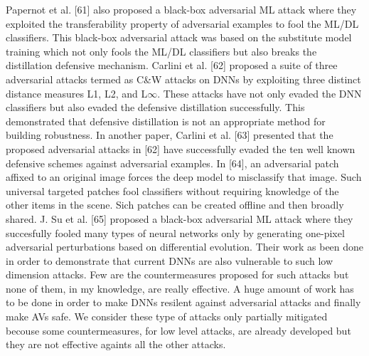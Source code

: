     \newline
    Papernot et al. [61] also proposed a black-box adversarial ML attack where they exploited the transferability property of adversarial examples to fool the ML/DL classifiers. This black-box adversarial attack was based on the substitute model training which not only fools the ML/DL classifiers but also breaks the distillation defensive mechanism. 
    \newline
    Carlini et al. [62] proposed a suite of three adversarial attacks termed as C\&W attacks on DNNs by exploiting three distinct distance measures L1, L2, and L$\infty$. These attacks have not only evaded the DNN classifiers but also evaded the defensive distillation successfully. This demonstrated that defensive distillation is not an appropriate method for building robustness. In another paper, Carlini et al. [63] presented that the proposed adversarial attacks in [62] have successfully evaded the ten well known defensive schemes against adversarial examples.
    \newline
    In [64], an adversarial patch affixed to an original image forces the deep model to misclassify that image. Such universal targeted patches fool classifiers without requiring knowledge of the other items in the scene. Sich patches can be created offline and then broadly shared. 
    \newline
    J. Su et al. [65] proposed a black-box adversarial ML attack where they succesfully fooled many types of neural networks only by generating one-pixel adversarial perturbations based on differential evolution. Their work as been done in order to demonstrate that current DNNs are also vulnerable to such low dimension attacks.
    \newline
    Few are the countermeasures proposed for such attacks but none of them, in my knowledge, are really effective. A huge amount of work has to be done in order to make DNNs resilent against adversarial attacks and finally make AVs safe. We consider these type of attacks only partially mitigated becouse some countermeasures, for low level attacks, are already developed but they are not effective againts all the other attacks. 
    
    